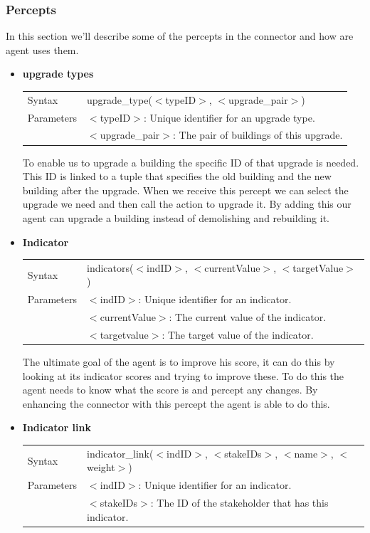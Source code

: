 \subsubsection{Percepts}
In this section we'll describe some of the percepts in the connector and how are agent uses them.

\begin{itemize}
	\item \textbf{upgrade types} \\ 
	\begin{tabular}{ l l }
 		 Syntax & upgrade\_type($<$typeID$>$, $<$upgrade\_pair$>$) \\
  		Parameters &  $<$typeID$>$: Unique identifier for an upgrade type. 
				\\& $<$upgrade\_pair$>$: The pair of buildings of this upgrade. 
	\end{tabular}
	To enable us to upgrade a building the specific ID of that upgrade is needed. This ID is linked to a tuple that specifies the old building and the new building after the upgrade. When we receive this percept we can select the upgrade we need and then call the action to upgrade it. By adding this our agent can upgrade a building instead of demolishing and rebuilding it.
	\item \textbf{Indicator} \\ 
	\begin{tabular}{ l l }
 		 Syntax & indicators($<$indID$>$, $<$currentValue$>$, $<$targetValue$>$) \\
  		Parameters &  $<$indID$>$: Unique identifier for an indicator. 
				\\& $<$currentValue$>$: The current value of the indicator. 
				\\& $<$targetvalue$>$: The target value of the indicator. 
	\end{tabular}
	The ultimate goal of the agent is to improve his score, it can do this by looking at its indicator scores and trying to improve these. To do this the agent needs to know what the score is and percept any changes. By enhancing the connector with this percept the agent is able to do this.
	\item \textbf{Indicator link} \\ 
	\begin{tabular}{ l l }
 		 Syntax & indicator\_link($<$indID$>$, $<$stakeIDs$>$, $<$name$>$, $<$weight$>$) \\
  		Parameters &  $<$indID$>$: Unique identifier for an indicator. 
				\\& $<$stakeIDs$>$: The ID of the stakeholder that has this indicator. 

\end{tabular}
\end{itemize}
